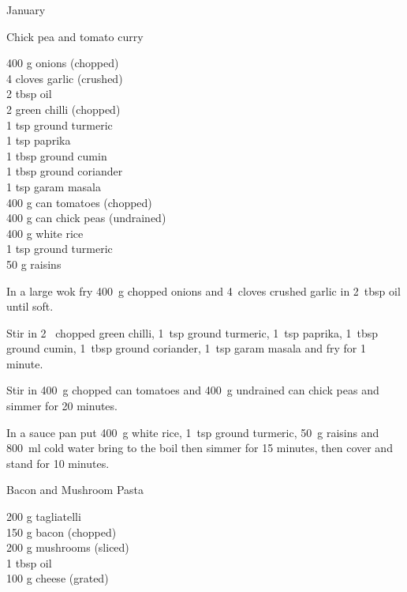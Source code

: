 \begin{menu}{January}
\begin{recipe}{2}{Chick pea and tomato curry}
		\begin{ingredients}
		400 g onions (chopped) \\
	4 cloves garlic (crushed) \\
	2 tbsp oil  \\
	2  green chilli (chopped) \\
	1 tsp ground turmeric  \\
	1 tsp paprika  \\
	1 tbsp ground cumin  \\
	1 tbsp ground coriander  \\
	1 tsp garam masala  \\
	400 g can tomatoes (chopped) \\
	400 g can chick peas (undrained) \\
	400 g white rice  \\
	1 tsp ground turmeric  \\
	50 g raisins  \\
	
		\end{ingredients}
	
	
    \begin{instructions}
    \item 
        In a large wok fry
        400~g chopped onions
        and
        4~cloves crushed garlic
        in
        2~tbsp  oil
        until soft.
      \item 
        Stir in
        2~ chopped green chilli,
        1~tsp  ground turmeric,
        1~tsp  paprika,
        1~tbsp  ground cumin,
        1~tbsp  ground coriander,
        1~tsp  garam masala
        and fry for 1 minute.
      \item 
        Stir in
        400~g chopped can tomatoes
        and
        400~g undrained can chick peas
        and simmer for 20 minutes.
      \item 
      In a
      sauce pan
      put
      400~g  white rice,
      1~tsp  ground turmeric,
      50~g  raisins
      and
      800~ml  cold water
      bring to the boil then simmer for 15 minutes,
      then cover and stand for 10 minutes.
    
    \end{instructions}
    \end{recipe}%
  
    \begin{recipe}{1}{Bacon and Mushroom Pasta}%
    
		\begin{ingredients}
		200 g tagliatelli  \\
	150 g bacon (chopped) \\
	200 g mushrooms (sliced) \\
	1 tbsp oil  \\
	100 g cheese (grated) \\
	

\end{ingredients}
\end{recipe}
\end{menu}
